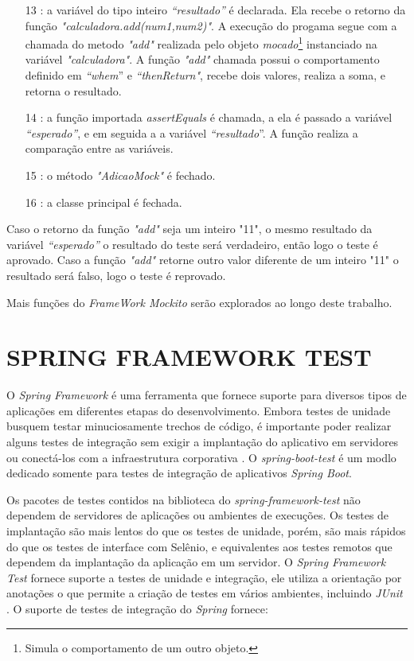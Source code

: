 \begin{itemize}
\item[13]: a variável do tipo inteiro \textit{“resultado”} é declarada. Ela recebe o retorno da função \textit{"calculadora.add(num1,num2)"}. A execução do progama segue com a chamada do metodo  \textit{"add"} realizada pelo objeto \textit{mocado}\footnote{Simula o comportamento de um outro objeto.} instanciado na variável \textit{"calculadora"}. A função \textit{"add"} chamada possui o comportamento definido em \textit{“whem}”  e \textit{“thenReturn"}, recebe dois valores, realiza a soma, e retorna o resultado.

\item[14]: a função importada \textit{assertEquals} é chamada, a ela é passado a variável \textit{“esperado”}, e em seguida a a variável \textit{“resultado}”. A função realiza a comparação entre as variáveis.

\item[15]: o método \textit{"AdicaoMock"} é fechado.

\item[16]: a classe principal é fechada.

\end{itemize}

Caso o retorno da função \textit{"add"} seja um inteiro "11", o mesmo resultado da variável \textit{“esperado”} o resultado do teste será verdadeiro, então logo o teste é aprovado. Caso a função \textit{"add"}  retorne outro valor diferente de um inteiro "11"   o resultado será falso, logo o teste é reprovado. 


    Mais funções do \textit{FrameWork Mockito} serão explorados ao longo deste trabalho.

\section{SPRING FRAMEWORK TEST}

O \textit{Spring Framework} é uma ferramenta que fornece suporte para diversos tipos de aplicações em diferentes etapas do desenvolvimento. Embora testes de unidade busquem testar minuciosamente trechos de código, é importante poder realizar alguns testes de integração sem exigir a implantação do aplicativo em  servidores ou conectá-los com a infraestrutura corporativa \cite{spring}. O \textit{spring-boot-test} é um modlo dedicado somente para testes de integração de aplicativos \textit{Spring Boot}.


Os pacotes de testes contidos na biblioteca do \textit{spring-framework-test} não dependem de servidores de aplicações ou ambientes de execuções. Os testes de implantação são mais lentos do que os testes de unidade, porém, são mais rápidos do que os testes de  interface com Selênio, e equivalentes aos testes remotos que dependem da implantação da aplicação em um servidor. O \textit{Spring Framework Test} fornece suporte a testes de unidade e integração, ele utiliza a orientação por anotações o que permite a criação de testes em vários ambientes, incluindo \textit{JUnit} \cite{spring}. O suporte de testes de integração do \textit{Spring} fornece: 

